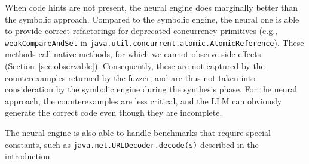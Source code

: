 \documentclass[sigconf]{acmart}
\begin{document}
When code hints are not present, the neural engine does mar\-gin\-al\-ly better
than the symbolic approach.
%
%
%
%
Compared to the symbolic engine, the neural one is able to provide correct
refactorings for deprecated concurrency primitives (e.g.,
\lstinline{weakCompareAndSet} in
\lstinline[breaklines=true]{java.util.concurrent.atomic.AtomicReference}).
These methods call native methods, for which we cannot observe side-effects
(Section~\ref{sec:observable}).  Consequently, these are not captured by
the counterexamples returned by the fuzzer, and are thus not taken into
consideration by the symbolic engine during the synthesis phase.  For the
neural approach, the counterexamples are less critical, and the LLM can
obviously generate the correct code even though they are incomplete.

%
The neural engine is also able to handle benchmarks that require special
constants, such as
\lstinline[breaklines=true]{java.net.URLDecoder.decode(s)} described in the
introduction.






\end{document}
